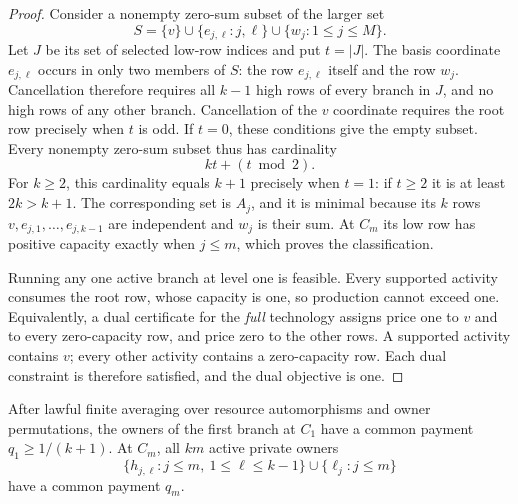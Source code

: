\begin{proof}
Consider a nonempty zero-sum subset of the larger set
\[
  S=\{v\}\cup\{e_{j,\ell}:j,\ell\}\cup\{w_j:1\leq j\leq M\}.
\]
Let $J$ be its set of selected low-row indices and put $t=|J|$.  The basis
coordinate $e_{j,\ell}$ occurs in only two members of $S$: the row
$e_{j,\ell}$ itself and the row $w_j$.  Cancellation therefore requires all
$k-1$ high rows of every branch in $J$, and no high rows of any other branch.
Cancellation of the $v$ coordinate requires the root row precisely when $t$
is odd.  If $t=0$, these conditions give the empty subset.  Every nonempty
zero-sum subset thus has cardinality
\begin{equation}
  kt+(t\bmod 2).
  \label{arity:dependency-cardinality}
\end{equation}
For $k\geq2$, this cardinality equals $k+1$ precisely when $t=1$: if $t\geq2$
it is at least $2k>k+1$.  The corresponding set is $A_j$, and it is minimal
because its $k$ rows $v,e_{j,1},\ldots,e_{j,k-1}$ are independent and $w_j$
is their sum.  At $C_m$ its low row has positive capacity exactly when
$j\leq m$, which proves the classification.

Running any one active branch at level one is feasible.  Every supported
activity consumes the root row, whose capacity is one, so production cannot
exceed one.  Equivalently, a dual certificate for the \emph{full} technology
assigns price one to $v$ and to every zero-capacity row, and price zero to
the other rows.  A supported activity contains $v$; every other activity
contains a zero-capacity row.  Each dual constraint is therefore satisfied,
and the dual objective is one.
\end{proof}

\begin{lemma}
\label{arity:orbits}
After lawful finite averaging over resource automorphisms and owner
permutations, the owners of the first branch at $C_1$ have a common payment
$q_1\geq1/(k+1)$.  At $C_m$, all $km$ active private owners
\[
  \{h_{j,\ell}:j\leq m,\ 1\leq\ell\leq k-1\}
  \cup\{\ell_j:j\leq m\}
\]
have a common payment $q_m$.
\end{lemma}

